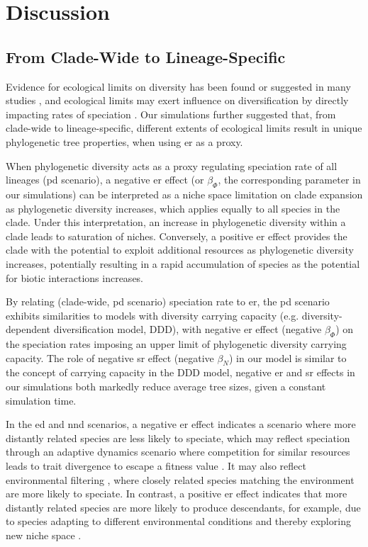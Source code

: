 {\section{Discussion}
\label{ch1::sec::discussion}
\subsection{From Clade-Wide to Lineage-Specific}
\label{ch1::sec::discussion::clade-to-lineage}
Evidence for ecological limits on diversity has been found or suggested in many studies \citep{rabosky_ecological_2009,mittelbach_evolution_2007}, and ecological limits may exert influence on diversification by directly impacting rates of speciation \citep{wiens_causes_2011}. Our simulations further suggested that, from clade-wide to lineage-specific, different extents of ecological limits result in unique phylogenetic tree properties, when using \acrshort{er} as a proxy. 

When phylogenetic diversity acts as a proxy regulating speciation rate of all lineages (\acrshort{pd} scenario), a negative \acrshort{er} effect (or $\beta_\varPhi$, the corresponding parameter in our simulations) can be interpreted as a niche space limitation on clade expansion as phylogenetic diversity increases, which applies equally to all species in the clade. Under this interpretation, an increase in phylogenetic diversity within a clade leads to saturation of niches. Conversely, a positive \acrshort{er} effect provides the clade with the potential to exploit additional resources as phylogenetic diversity increases, potentially resulting in a rapid accumulation of species as the potential for biotic interactions increases. 

By relating (clade-wide, \acrshort{pd} scenario) speciation rate to \acrshort{er}, the \acrshort{pd} scenario exhibits similarities to models with diversity carrying capacity (e.g. diversity-dependent diversification model, DDD), with negative \acrshort{er} effect (negative $\beta_\varPhi$) on the speciation rates imposing an upper limit of phylogenetic diversity carrying capacity. The role of negative \acrshort{sr} effect (negative $\beta_N$) in our model is similar to the concept of carrying capacity in the DDD model, negative \acrshort{er} and \acrshort{sr} effects in our simulations both markedly reduce average tree sizes, given a constant simulation time.

In the \acrshort{ed} and \acrshort{nnd} scenarios, a negative \acrshort{er} effect indicates a scenario where more distantly related species are less likely to speciate, which may reflect speciation through an adaptive dynamics scenario where competition for similar resources leads to trait divergence to escape a fitness value \citep{geritz_evolutionary_1999,bolnick_sympatric_2007}. It may also reflect environmental filtering \citep{thakur_environmental_2017}, where closely related species matching the environment are more likely to speciate. In contrast, a positive \acrshort{er} effect indicates that more distantly related species are more likely to produce descendants, for example, due to species adapting to different environmental conditions and thereby exploring new niche space \citep{kozak_does_2006}. 

}
